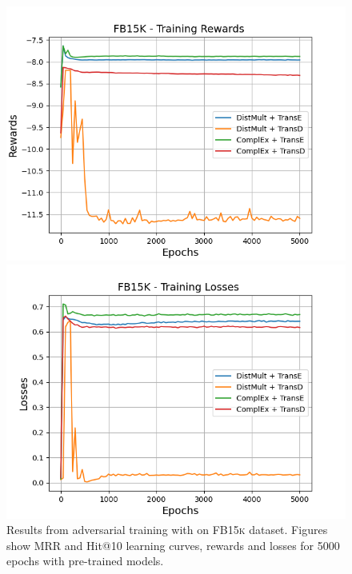 \begin{figure}
    \begin{minipage}{.45\textwidth}
      \centering
      \includegraphics[width=0.9\linewidth]{figures/results/gan_train/pretrained/uncertainty/max/entropy/fb15k/5k_epochs/uncertainty_fb15k_rew.png}
    \end{minipage}%
     \begin{minipage}{.45\textwidth}
      \centering
      \includegraphics[width=0.9\linewidth]{figures/results/gan_train/pretrained/uncertainty/max/entropy/fb15k/5k_epochs/uncertainty_fb15k_losses.png}
    \end{minipage}%
    \caption{Results from adversarial training with \usmax on \textsc{FB15k} dataset.
    Figures show MRR and Hit@10 learning curves, rewards and losses for 5000 epochs with pre-trained models.}
    \label{fig:gan_train_pretrained_usmax_fb15k}
\end{figure}
